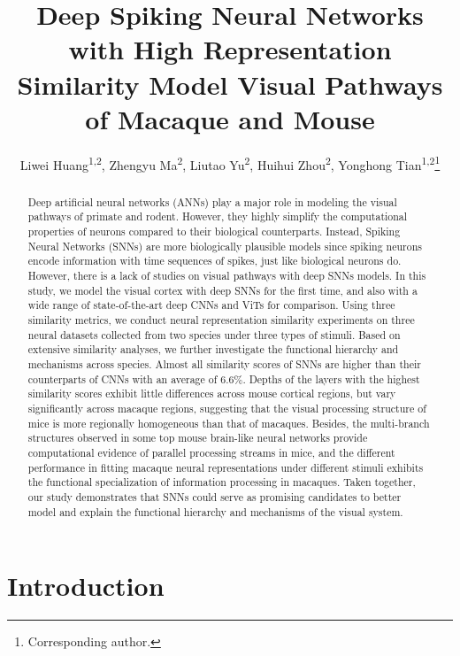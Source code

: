 \documentclass[letterpaper]{article} %
\title{Deep Spiking Neural Networks with High Representation Similarity Model Visual Pathways of Macaque and Mouse}
\author {
Liwei Huang\textsuperscript{\rm 1,\rm 2},
Zhengyu Ma\textsuperscript{\rm 2}\footnotemark[1],
Liutao Yu\textsuperscript{\rm 2},
Huihui Zhou\textsuperscript{\rm 2},
Yonghong Tian\textsuperscript{\rm 1,\rm 2}\thanks{Corresponding author.}
}
\begin{document}
\maketitle

\begin{abstract}
Deep artificial neural networks (ANNs) play a major role in modeling the visual pathways of primate and rodent. However, they highly simplify the computational properties of neurons compared to their biological counterparts. Instead, Spiking Neural Networks (SNNs) are more biologically plausible models since spiking neurons encode information with time sequences of spikes, just like biological neurons do. However, there is a lack of studies on visual pathways with deep SNNs models. In this study, we model the visual cortex with deep SNNs for the first time, and also with a wide range of state-of-the-art deep CNNs and ViTs for comparison. Using three similarity metrics, we conduct neural representation similarity experiments on three neural datasets collected from two species under three types of stimuli. Based on extensive similarity analyses, we further investigate the functional hierarchy and mechanisms across species. Almost all similarity scores of SNNs are higher than their counterparts of CNNs with an average of $6.6\%$. Depths of the layers with the highest similarity scores exhibit little differences across mouse cortical regions, but vary significantly across macaque regions, suggesting that the visual processing structure of mice is more regionally homogeneous than that of macaques. Besides, the multi-branch structures observed in some top mouse brain-like neural networks provide computational evidence of parallel processing streams in mice, and the different performance in fitting macaque neural representations under different stimuli exhibits the functional specialization of information processing in macaques. Taken together, our study demonstrates that SNNs could serve as promising candidates to better model and explain the functional hierarchy and mechanisms of the visual system.
\end{abstract}

\section{Introduction}
\label{intro}
\end{document}
